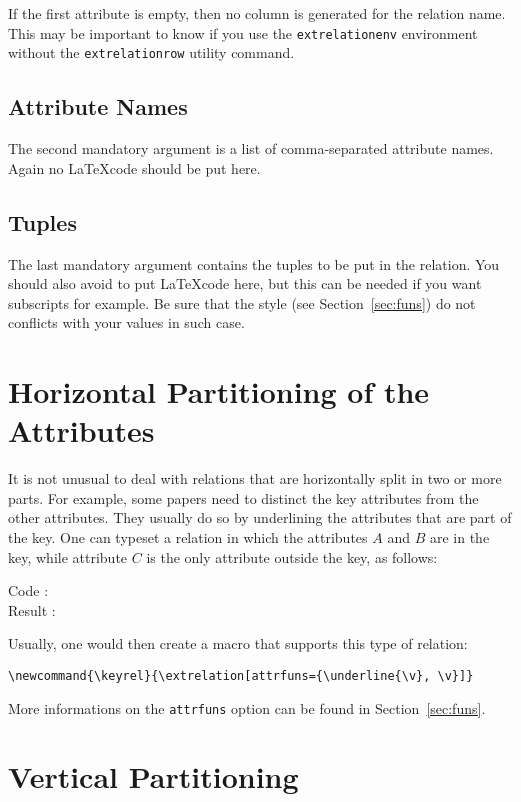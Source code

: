 \documentclass{ltxdoc}
\newcommand{\example}[1]{
  \indent Code : \texttt{\detokenize{#1}} \\
  \indent Result : #1
}
\begin{document}
If the first attribute is empty, then no column is generated for the relation
name. This may be important to know if you use the \texttt{extrelationenv}
environment without the \texttt{extrelationrow} utility command.

\subsection{Attribute Names}

The second mandatory argument is a list of comma-separated attribute names.
Again no \LaTeX code should be put here.

\subsection{Tuples}

The last mandatory argument contains the tuples to be put in the relation. You
should also avoid to put \LaTeX code here, but this can be needed if you want
subscripts for example. Be sure that the style (see Section~\ref{sec:funs}) do
not conflicts with your values in such case.

\section{Horizontal Partitioning of the Attributes} \label{sec:attrpart}

It is not unusual to deal with relations that are horizontally split in two or
more parts. For example, some papers need to distinct the key attributes from
the other attributes. They usually do so by underlining the attributes that are
part of the key. One can typeset a relation in which the attributes $A$ and $B$
are in the key, while attribute $C$ is the only attribute outside the key, as
follows:

\example{\extrelation[attrfuns={\underline{\v}, \v}]{}{A, B; C}{a, b, c}}

Usually, one would then create a macro that supports this type of relation:

\verb!\newcommand{\keyrel}{\extrelation[attrfuns={\underline{\v}, \v}]}!

More informations on the \texttt{attrfuns} option can be found in
Section~\ref{sec:funs}.

\section{Vertical Partitioning}
\end{document}
